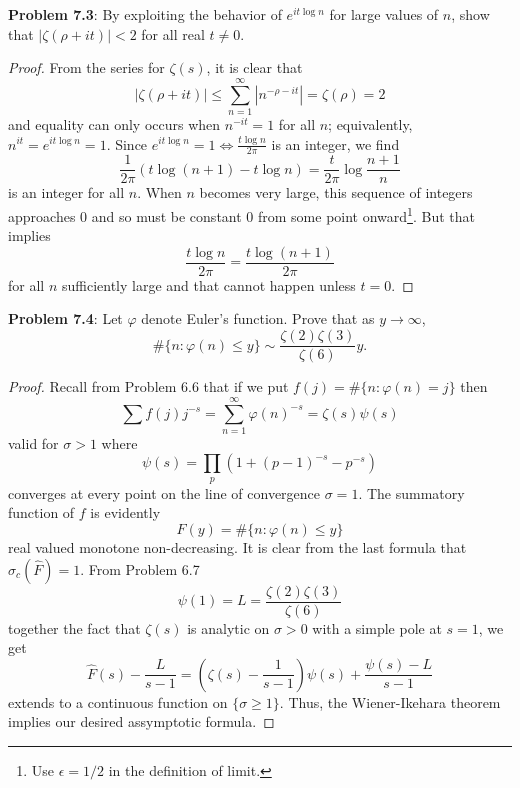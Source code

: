 \documentclass[12pt]{article}
\newcommand{\Fhat}{\widehat{F}}
\begin{document}
\fi

\textbf{Problem 7.3}: By exploiting the behavior of $e^{it\log n}$ for large values of $n$, show that $|\zeta(\rho + it)| < 2$ for all real $t \not= 0$.

\begin{proof}
From the series for $\zeta(s)$, it is clear that
$$|\zeta(\rho + it)| \leq \sum_{n=1}^{\infty} |n^{-\rho-it}| = \zeta(\rho) = 2$$
and equality can only occurs when $n^{-i t} = 1$ for all $n$; equivalently, $n^{i t} = e^{i t \log n} = 1$. Since $e^{i t \log n} = 1 \iff \frac{t \log n}{2\pi}$ is an integer, we find
$$\frac{1}{2\pi} (t \log(n + 1) - t \log n) = \frac{t}{2\pi} \log \frac{n+1}{n}$$
is an integer for all $n$. When $n$ becomes very large, this sequence of integers approaches 0 and so must be constant 0 from some point onward\footnote{Use $\epsilon = 1/2$ in the definition of limit.}. But that implies
$$\frac{t \log n}{2\pi} = \frac{t \log (n + 1)}{2\pi}$$
for all $n$ sufficiently large and that cannot happen unless $t = 0$.
\end{proof}

\textbf{Problem 7.4}: Let $\varphi$ denote Euler's function. Prove that as $y \rightarrow \infty$,
$$\#\{n: \varphi(n) \leq y\} \sim \frac{\zeta(2)\zeta(3)}{\zeta(6)} y.$$

\begin{proof}
Recall from Problem 6.6 that if we put $f(j) = \#\{n : \varphi(n) = j\}$ then
$$\sum f(j) j^{-s} = \sum_{n=1}^{\infty} \varphi(n)^{-s} = \zeta(s) \psi(s)$$
valid for $\sigma > 1$ where
$$\psi(s) = \prod_p (1 + (p-1)^{-s} - p^{-s})$$
converges at every point on the line of convergence $\sigma = 1$. The summatory function of $f$ is evidently
$$F(y) = \#\{n: \varphi(n) \leq y\}$$
real valued monotone non-decreasing. It is clear from the last formula that $\sigma_c(\Fhat) = 1$. From Problem 6.7
$$\psi(1) = L = \frac{\zeta(2)\zeta(3)}{\zeta(6)}$$
together the fact that $\zeta(s)$ is analytic on $\sigma > 0$ with a simple pole at $s = 1$, we get
$$\Fhat(s) - \frac{L}{s - 1} = \left(\zeta(s) - \frac{1}{s-1}\right) \psi(s) + \frac{\psi(s) - L}{s - 1}$$
extends to a continuous function on $\{\sigma \geq 1\}$. Thus, the Wiener-Ikehara theorem implies our desired assymptotic formula.
\end{proof}

\unless\ifdefined\IsMainDocument
\end{document}
